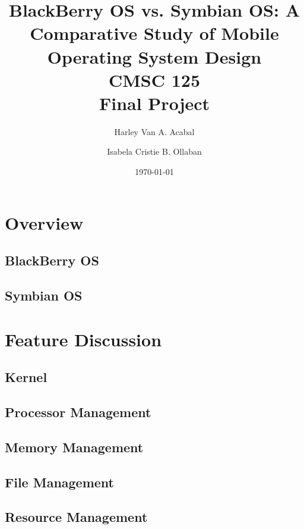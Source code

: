 \documentclass[fleqn]{article}
\title{BlackBerry OS vs. Symbian OS: A Comparative Study of Mobile Operating System Design
\\ CMSC 125 \\ Final Project}
\author{Harley Van A. Acabal \and Isabela Cristie B. Ollaban}
\date{\today \\}
\begin{document}
\maketitle
\newpage

\tableofcontents
\newpage

\section{Overview}
\subsection{BlackBerry OS}

\subsection{Symbian OS}


\section{Feature Discussion}

\subsection{Kernel}




\subsection{Processor Management}




\subsection{Memory Management}




\subsection{File Management}




\subsection{Resource Management}



\end{document}
